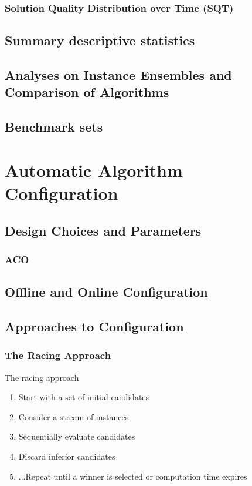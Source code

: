 \documentclass[a4paper,10pt]{article}
\begin{document}
	\subsubsection{Solution Quality Distribution over Time (SQT)}

\subsection{Summary descriptive statistics}
	\subsection{Analyses on Instance Ensembles and Comparison of Algorithms}
	
	\subsection{Benchmark sets}
	
	
\section{Automatic Algorithm Configuration}
	\subsection{Design Choices and Parameters}
	

		\subsubsection{ACO}
			\subsection{Offline and Online Configuration}
	
	
	\subsection{Approaches to Configuration}	
	
		\subsubsection{The Racing Approach}
		
		The racing approach
\begin{enumerate}
	\item Start with a set of initial candidates
	\item Consider a stream of instances
	\item Sequentially evaluate candidates
	\item Discard inferior candidates
	\item ...Repeat until a winner is selected or computation time expires
\end{enumerate}
\end{document}
